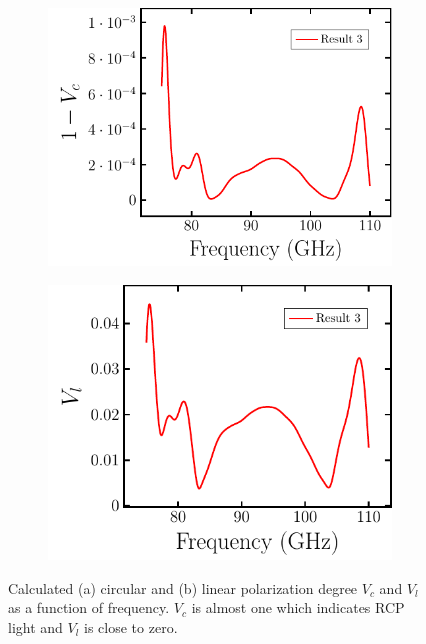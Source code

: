 \begin{figure}[H]
    \begin{subfigure}[b]{.5\linewidth}
    \caption{}\label{}
    \centering\includegraphics[scale=0.6]{images/results/plots/polymer/polDeg_a.pdf}
    \end{subfigure}%
    \begin{subfigure}[b]{.5\linewidth}
    \caption{}\label{}
    \centering\includegraphics[scale=0.6]{images/results/plots/polymer/polDeg_b.pdf}
    \end{subfigure}
    \caption{Calculated (a) circular and (b) linear polarization degree $V_c$ and $V_l$ as a function of frequency. $V_c$ is almost one which indicates RCP light and $V_l$ is close to zero.}
    \label{fig:polymer_pol_deg}
\end{figure}

